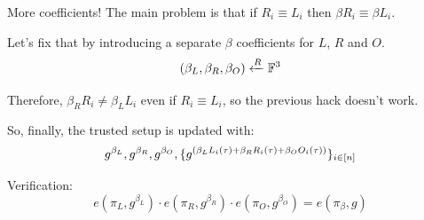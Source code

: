 \documentclass{zkdl-presentation-template}
\begin{document}
    \begin{frame}{More coefficients!}
        The main problem is that if $R_i \equiv L_i$ then $\beta R_i \equiv \beta L_i$.\pause

        Let's fix that by introducing a separate $\beta$ coefficients for $L$, $R$ and $O$.
        \begin{equation*}
            \left( \beta_L, \beta_R, \beta_O \right) \xleftarrow{R} \mathbb{F}^3
            \vspace{-5pt}
        \end{equation*}
        
        \pause
        Therefore, $\beta_R R_i \neq \beta_L L_i$ even if $R_i \equiv L_i$, so the previous hack doesn't work.\pause

        So, finally, the trusted setup is updated with:
        \vspace{-5pt}
        \begin{equation*}
            g^{\beta_L}, g^{\beta_R}, g^{\beta_O}, \{g^{\left( \beta_LL_i(\tau) + \beta_RR_i(\tau) + \beta_OO_i(\tau) \right)}\}_{i \in \left[ n \right]}
            \vspace{-5pt}
        \end{equation*}

        \pause
        Verification:
        \vspace{-5pt}
        \begin{equation*}
            e(\pi_L, g^{\beta_L}) \cdot e(\pi_R, g^{\beta_R}) \cdot e(\pi_O, g^{\beta_O}) = e(\pi_{\beta}, g)
        \end{equation*}
    \end{frame}
\end{document}
